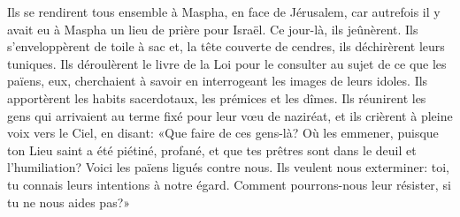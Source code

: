 Ils se rendirent tous ensemble à Maspha, en face de Jérusalem,
	car autrefois il y avait eu à Maspha un lieu de prière pour Israël.
Ce jour-là, ils jeûnèrent. Ils s’enveloppèrent de toile à sac
	et, la tête couverte de cendres, ils déchirèrent leurs tuniques.
Ils déroulèrent le livre de la Loi pour le consulter
	au sujet de ce que les païens, eux, cherchaient à savoir
		en interrogeant les images de leurs idoles.
Ils apportèrent les habits sacerdotaux, les prémices et les dîmes.
Ils réunirent les gens qui arrivaient au terme fixé pour leur vœu de naziréat,
	et ils crièrent à pleine voix vers le Ciel, en disant:
	«Que faire de ces gens-là?
	Où les emmener, puisque ton Lieu saint a été piétiné, profané,
	et que tes prêtres sont dans le deuil et l’humiliation?
Voici les païens ligués contre nous. Ils veulent nous exterminer:
	toi, tu connais leurs intentions à notre égard.
Comment pourrons-nous leur résister, si tu ne nous aides pas?»

